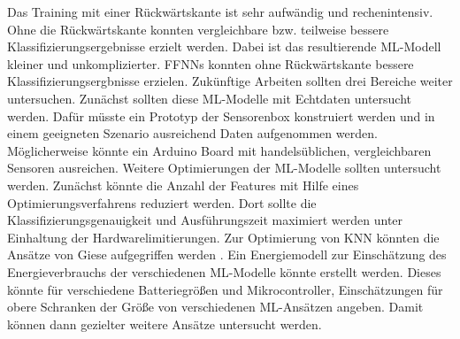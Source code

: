 \newline
Das Training mit einer Rückwärtskante ist sehr aufwändig und rechenintensiv.
Ohne die Rückwärtskante konnten vergleichbare bzw. teilweise bessere Klassifizierungsergebnisse erzielt werden.
Dabei ist das resultierende ML-Modell kleiner und unkomplizierter.
FFNNs konnten ohne Rückwärtskante bessere Klassifizierungsergbnisse erzielen.
\newline
\newline
Zukünftige Arbeiten sollten drei Bereiche weiter untersuchen.
Zunächst sollten diese ML-Modelle mit Echtdaten untersucht werden.
Dafür müsste ein Prototyp der Sensorenbox konstruiert werden und in
einem geeigneten Szenario ausreichend Daten aufgenommen werden.
Möglicherweise könnte ein Arduino Board mit handelsüblichen, vergleichbaren Sensoren ausreichen.
\newline
\newline
Weitere Optimierungen der ML-Modelle sollten untersucht werden.
Zunächst könnte die Anzahl der Features mit Hilfe eines Optimierungsverfahrens reduziert werden.
Dort sollte die Klassifizierungsgenauigkeit und Ausführungszeit maximiert werden unter Einhaltung der Hardwarelimitierungen.
Zur Optimierung von KNN könnten die Ansätze von Giese aufgegriffen werden \cite{gieseThesis}.
\newline
\newline
Ein Energiemodell zur Einschätzung des Energieverbrauchs der verschiedenen ML-Modelle könnte erstellt werden.
Dieses könnte für verschiedene Batteriegrößen und Mikrocontroller, Einschätzungen für obere Schranken der Größe von
verschiedenen ML-Ansätzen angeben.
Damit können dann gezielter weitere Ansätze untersucht werden.